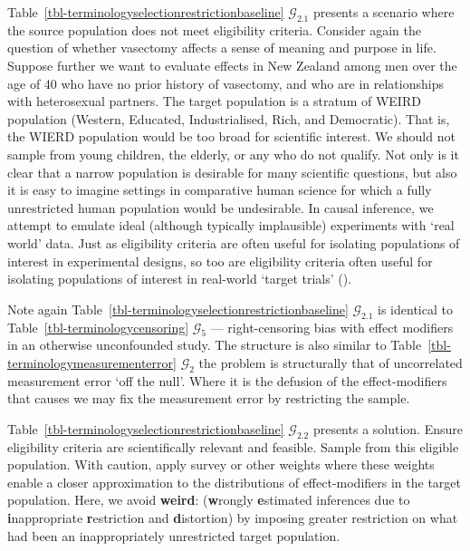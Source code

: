 \documentclass[
  single column]{article}
\begin{document}
Table~\ref{tbl-terminologyselectionrestrictionbaseline}
\(\mathcal{G}_{2.1}\) presents a scenario where the source population
does not meet eligibility criteria. Consider again the question of
whether vasectomy affects a sense of meaning and purpose in life.
Suppose further we want to evaluate effects in New Zealand among men
over the age of 40 who have no prior history of vasectomy, and who are
in relationships with heterosexual partners. The target population is a
stratum of WEIRD population (Western, Educated, Industrialised, Rich,
and Democratic). That is, the WIERD population would be too broad for
scientific interest. We should not sample from young children, the
elderly, or any who do not qualify. Not only is it clear that a narrow
population is desirable for many scientific questions, but also it is
easy to imagine settings in comparative human science for which a fully
unrestricted human population would be undesirable. In causal inference,
we attempt to emulate ideal (although typically implausible) experiments
with `real world' data. Just as eligibility criteria are often useful
for isolating populations of interest in experimental designs, so too
are eligibility criteria often useful for isolating populations of
interest in real-world `target trials'
().

Note again Table~\ref{tbl-terminologyselectionrestrictionbaseline}
\(\mathcal{G}_{2.1}\) is identical to
Table~\ref{tbl-terminologycensoring} \(\mathcal{G}_5\) ---
right-censoring bias with effect modifiers in an otherwise unconfounded
study. The structure is also similar to
Table~\ref{tbl-terminologymeasurementerror} \(\mathcal{G}_2\) the
problem is structurally that of uncorrelated measurement error `off the
null'. Where it is the defusion of the effect-modifiers that causes we
may fix the measurement error by restricting the sample.

Table~\ref{tbl-terminologyselectionrestrictionbaseline}
\(\mathcal{G}_{2.2}\) presents a solution. Ensure eligibility criteria
are scientifically relevant and feasible. Sample from this eligible
population. With caution, apply survey or other weights where these
weights enable a closer approximation to the distributions of
effect-modifiers in the target population. Here, we avoid
\textbf{weird}: (\textbf{w}rongly \textbf{e}stimated inferences due to
\textbf{i}nappropriate \textbf{r}estriction and \textbf{d}istortion) by
imposing greater restriction on what had been an inappropriately
unrestricted target population.
\end{document}
